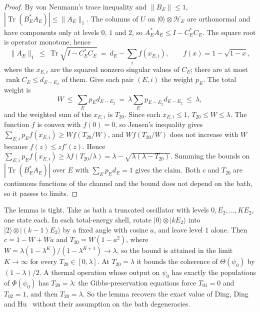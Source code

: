 \documentclass[11pt]{article}
\theoremstyle{definition}
\theoremstyle{remark}
\newcommand{\Tr}{\operatorname{Tr}}
\begin{document}
\begin{proof}
By von Neumann's trace inequality and $\|B_E\|\le1$, $|\Tr(B_E^*A_E)|\le\|A_E\|_1$. The columns of $U$ on $|0\rangle\otimes\mathcal H_E$ are orthonormal and have components only at levels $0$, $1$ and $2$, so $A_E^*A_E\le I-C_E^*C_E$. The square root is operator monotone, hence
\[
\|A_E\|_1\ \le\ \Tr\sqrt{I-C_E^*C_E}\ =\ d_E-\sum_if(x_{E,i}),\qquad f(x)=1-\sqrt{1-x},
\]
where the $x_{E,i}$ are the squared nonzero singular values of $C_E$; there are at most $\operatorname{rank}C_E\le d_{E-E_2}$ of them. Give each pair $(E,i)$ the weight $p_E$. The total weight is
\[
W\ \le\ \sum_Ep_Ed_{E-E_2}\ =\ \lambda\sum_Ep_{E-E_2}d_{E-E_2}\ \le\ \lambda,
\]
and the weighted sum of the $x_{E,i}$ is $T_{20}$. Since each $x_{E,i}\le1$, $T_{20}\le W\le\lambda$. The function $f$ is convex with $f(0)=0$, so Jensen's inequality gives $\sum_{E,i}p_Ef(x_{E,i})\ge Wf(T_{20}/W)$, and $Wf(T_{20}/W)$ does not increase with $W$ because $f(z)\le zf'(z)$. Hence $\sum_{E,i}p_Ef(x_{E,i})\ge\lambda f(T_{20}/\lambda)=\lambda-\sqrt{\lambda(\lambda-T_{20})}$. Summing the bounds on $|\Tr(B_E^*A_E)|$ over $E$ with $\sum_Ep_Ed_E=1$ gives the claim. Both $c$ and $T_{20}$ are continuous functions of the channel and the bound does not depend on the bath, so it passes to limits.
\end{proof}

The lemma is tight. Take as bath a truncated oscillator with levels $0,E_2,\dots,KE_2$, one state each. In each total-energy shell, rotate $|0\rangle\otimes|kE_2\rangle$ into $|2\rangle\otimes|(k-1)E_2\rangle$ by a fixed angle with cosine $a$, and leave level $1$ alone. Then $c=1-W+Wa$ and $T_{20}=W(1-a^2)$, where $W=\lambda(1-\lambda^K)/(1-\lambda^{K+1})\to\lambda$, so the bound is attained in the limit $K\to\infty$ for every $T_{20}\in[0,\lambda]$. At $T_{20}=\lambda$ it bounds the coherence of $\Theta(\psi_0)$ by $(1-\lambda)/2$. A thermal operation whose output on $\psi_0$ has exactly the populations of $\Phi(\psi_0)$ has $T_{20}=\lambda$: the Gibbs-preservation equations force $T_{01}=0$ and $T_{02}=1$, and then $T_{20}=\lambda$. So the lemma recovers the exact value of Ding, Ding and Hu~\cite{DingFengHu21} without their assumption on the bath degeneracies.
\end{document}
